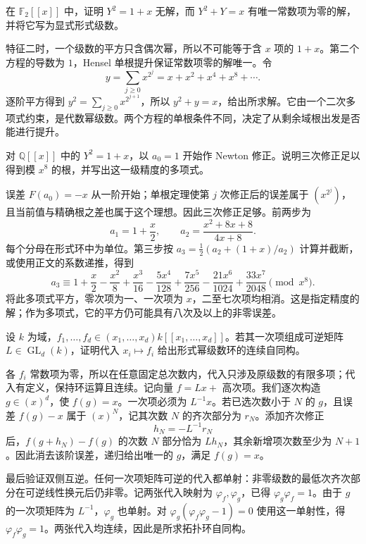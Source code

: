 \begin{exercise}\label{g5:ex:hensel-characteristic-two}
	在 \(\mathbb F_2[[x]]\) 中，证明 \(Y^2=1+x\) 无解，而 \(Y^2+Y=x\) 有唯一常数项为零的解，并将它写为显式形式级数。
\end{exercise}
\begin{solution}
	特征二时，一个级数的平方只含偶次幂，所以不可能等于含 \(x\) 项的 \(1+x\)。第二个方程的导数为 \(1\)，Hensel 单根提升保证常数项零的解唯一。令
	\[
		y=\sum_{j\geq0}x^{2^j}=x+x^2+x^4+x^8+\cdots.
	\]
	逐阶平方得到 \(y^2=\sum_{j\geq0}x^{2^{j+1}}\)，所以 \(y^2+y=x\)，给出所求解。它由一个二次多项式约束，是代数幂级数。两个方程的单根条件不同，决定了从剩余域根出发是否能进行提升。
\end{solution}

\begin{exercise}\label{g5:ex:newton-square-root-precision}
	对 \(\mathbb Q[[x]]\) 中的 \(Y^2=1+x\)，以 \(a_0=1\) 开始作 Newton 修正。说明三次修正足以得到模 \(x^8\) 的根，并写出这一级精度的多项式。
\end{exercise}
\begin{solution}
	误差 \(F(a_0)=-x\) 从一阶开始；单根定理使第 \(j\) 次修正后的误差属于 \((x^{2^j})\)，且当前值与精确根之差也属于这个理想。因此三次修正足够。前两步为
	\[
		a_1=1+\frac{x}{2},\qquad
		a_2=\frac{x^2+8x+8}{4x+8}.
	\]
	每个分母在形式环中为单位。第三步按
	\(a_3=\tfrac12(a_2+(1+x)/a_2)\) 计算并截断，或使用正文的系数递推，得到
	\[
		a_3\equiv
		1+\frac{x}{2}-\frac{x^2}{8}+\frac{x^3}{16}
		-\frac{5x^4}{128}+\frac{7x^5}{256}
		-\frac{21x^6}{1024}+\frac{33x^7}{2048}
		\pmod{x^8}.
	\]
	将此多项式平方，零次项为一、一次项为 \(x\)，二至七次项均相消。这是指定精度的解；作为多项式，它的平方仍可能具有八次及以上的非零误差。
\end{solution}

\begin{exercise}\label{g5:ex:formal-coordinate-inverse}
	设 \(k\) 为域，\(f_1,\ldots,f_d\in(x_1,\ldots,x_d)k[[x_1,\ldots,x_d]]\)。若其一次项组成可逆矩阵 \(L\in\operatorname{GL}_d(k)\)，证明代入 \(x_i\mapsto f_i\) 给出形式幂级数环的连续自同构。
\end{exercise}
\begin{solution}
	各 \(f_i\) 常数项为零，所以在任意固定总次数内，代入只涉及原级数的有限多项；代入有定义，保持环运算且连续。记向量 \(f=Lx+\) 高次项。我们逐次构造 \(g\in(x)^d\)，使 \(f(g)=x\)。一次项必须为 \(L^{-1}x\)。若已选次数小于 \(N\) 的 \(g\)，且误差 \(f(g)-x\) 属于 \((x)^N\)，记其次数 \(N\) 的齐次部分为 \(r_N\)。添加齐次修正
	\[
		h_N=-L^{-1}r_N
	\]
	后，\(f(g+h_N)-f(g)\) 的次数 \(N\) 部分恰为 \(Lh_N\)，其余新增项次数至少为 \(N+1\)。因此消去该阶误差，递归给出唯一的 \(g\)，满足 \(f(g)=x\)。

	最后验证双侧互逆。任何一次项矩阵可逆的代入都单射：非零级数的最低次齐次部分在可逆线性换元后仍非零。记两张代入映射为 \(\varphi_f,\varphi_g\)，已得
	\(\varphi_g\varphi_f=1\)。由于 \(g\) 的一次项矩阵为 \(L^{-1}\)，\(\varphi_g\) 也单射。对
	\(\varphi_g(\varphi_f\varphi_g-1)=0\) 使用这一单射性，得
	\(\varphi_f\varphi_g=1\)。两张代入均连续，因此是所求拓扑环自同构。
\end{solution}
